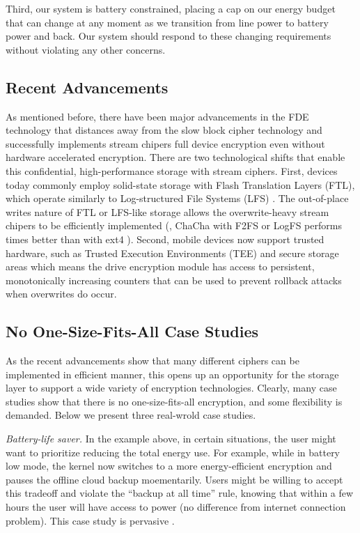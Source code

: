 Third, our system is battery constrained, placing a cap on our energy
budget that can change at any moment as we transition from line power to
battery power and back.  Our system should respond to these changing
requirements without violating any other concerns.


\subsection{Recent Advancements}

As mentioned before, there have been major advancements in the FDE
technology that distances away from the slow block cipher technology and
successfully implements stream chipers full device encryption
\cite{hbsh-citation???, Adiantum, StrongBox} even without hardware
accelerated encryption.  There are two technological shifts that enable
this confidential, high-performance storage with stream ciphers.  First,
devices today commonly employ solid-state storage with Flash Translation
Layers (FTL), which operate similarly to Log-structured File Systems (LFS)
\cite{21, 22, 27-fromStrongBox}.  The out-of-place writes nature of FTL or
LFS-like storage allows the overwrite-heavy stream chipers to be
efficiently implemented (\eg, ChaCha with F2FS or LogFS performs \xxx
times better than with ext4 \cite{StrongBox}).  Second, mobile devices now
support trusted hardware, such as Trusted Execution Environments (TEE)
\cite{24, 29-fromStrongBox} and secure storage areas
\cite{10-fromStrongBox} which means the drive encryption module has access
to persistent, monotonically increasing counters that can be used to
prevent rollback attacks when overwrites do occur.


\subsection{No One-Size-Fits-All Case Studies}

As the recent advancements show that many different ciphers can be
implemented in efficient manner, this opens up an opportunity for the
storage layer to support a wide variety of encryption technologies.
Clearly, many case studies show that there is no one-size-fits-all
encryption, and some flexibility is demanded.  Below we present three
real-wrold case studies.

{\em Battery-life saver.}  In the example above, in certain situations,
the user might want to prioritize reducing the total energy use.  For
example, while in battery low mode, the kernel now switches to a more
energy-efficient encryption and pauses the offline cloud backup
moementarily.  Users might be willing to accept this tradeoff and violate
the ``backup at all time'' rule, knowing that within a few hours the user
will have access to power (no difference from internet connection
problem).  This case study is pervasive
\cite{hackernews-???, many-more??}.

